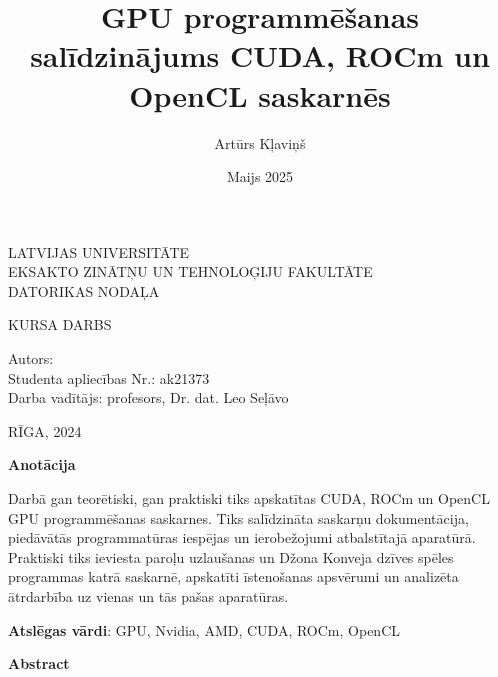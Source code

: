 \documentclass[12pt]{report}%
\author{Artūrs Kļaviņš}
\title{GPU programmēšanas salīdzinājums CUDA, ROCm un OpenCL saskarnēs}
\date{Maijs 2025}
\theoremstyle{definition}
\def\degree{Kursa darbs}
\def\faculty{Eksakto zinātņu un tehnoloģiju fakultāte}
\def\department{Datorikas nodaļa}
\def\vietlaiks{Rīga, 2024}
\def\supervisor{Darba vadītājs: profesors, Dr. dat. Leo Seļāvo}
\def\studaplieciba{ak21373}
\begin{document}
\thispagestyle{empty}
\makeatletter
   \begin{center}
       \vspace*{1cm}
        
    \vspace{10mm}
    {\Large LATVIJAS UNIVERSITĀTE\\
    \MakeUppercase{\faculty}\\
    \vspace{2mm}
    \MakeUppercase{\department}
    }
    \vspace*{10mm}
    
    
    
    \vspace{5mm}
    {\Large \MakeUppercase{\textbf{\@title}}}
    \vspace{5mm}
    

       \vspace{1cm}
    \Large
    \MakeUppercase{\degree}
    \end{center}
    \vspace{3cm}
    \begin{flushleft}
    \large
       Autors: \textbf{\large \@author}\\
       Studenta apliecības Nr.: \studaplieciba \\
       \supervisor
    \end{flushleft}

       \vfill
     
    \begin{center}
    \Large      
    \MakeUppercase{\vietlaiks}
   \end{center}
\makeatother

\newpage




\thispagestyle{empty}
\noindent \textbf{Anotācija}

\noindent Darbā gan teorētiski, gan praktiski tiks apskatītas CUDA, ROCm un OpenCL GPU
programmēšanas saskarnes. Tiks salīdzināta saskarņu dokumentācija, piedāvātās
programmatūras iespējas un ierobežojumi atbalstītajā aparatūrā. Praktiski tiks ieviesta
paroļu uzlaušanas un Džona Konveja dzīves spēles programmas katrā saskarnē,
apskatīti īstenošanas apsvērumi un analizēta ātrdarbība uz vienas un tās pašas
aparatūras.

\vspace{4mm}
\noindent \textbf{Atslēgas vārdi}: GPU, Nvidia, AMD, CUDA, ROCm, OpenCL

\vspace{20mm}
\noindent \textbf{Abstract}
\end{document}
